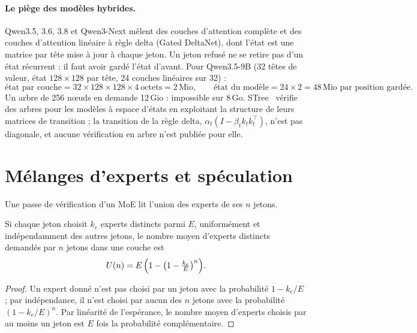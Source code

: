 \paragraph{Le piège des modèles hybrides.} Qwen3.5, 3.6, 3.8 et Qwen3-Next mêlent des couches d'attention complète et des couches d'attention linéaire à règle delta (Gated DeltaNet), dont l'état est une matrice par tête mise à jour à chaque jeton. Un jeton refusé ne se retire pas d'un état récurrent : il faut avoir gardé l'état d'avant. Pour Qwen3.5-9B (32 têtes de valeur, état $128 \times 128$ par tête, 24 couches linéaires sur 32) \calc :
\[
\text{état par couche} = 32 \times 128 \times 128 \times 4\ \text{octets} = 2\,\text{Mio}, \qquad \text{état du modèle} = 24 \times 2 = 48\,\text{Mio par position gardée}.
\]
Un arbre de 256 nœuds en demande 12\,Gio : impossible sur 8\,Go. STree~\cite{stree2025} vérifie des arbres pour les modèles à espace d'états en exploitant la structure de leurs matrices de transition ; la transition de la règle delta, $\alpha_t (I - \beta_t k_t k_t^\top)$, n'est pas diagonale, et aucune vérification en arbre n'est publiée pour elle.

\section{Mélanges d'experts et spéculation}\label{sec:moe-spec}

Une passe de vérification d'un MoE lit l'union des experts de ses $n$ jetons.

\begin{lemme}\label{lem:union}
Si chaque jeton choisit $k_e$ experts distincts parmi $E$, uniformément et indépendamment des autres jetons, le nombre moyen d'experts distincts demandés par $n$ jetons dans une couche est
\begin{equation}\label{eq:union}
U(n) = E\,\Bigl(1 - \bigl(1 - \tfrac{k_e}{E}\bigr)^{n}\Bigr).
\end{equation}
\end{lemme}

\begin{proof}
Un expert donné n'est pas choisi par un jeton avec la probabilité $1 - k_e/E$ ; par indépendance, il n'est choisi par aucun des $n$ jetons avec la probabilité $(1 - k_e/E)^n$. Par linéarité de l'espérance, le nombre moyen d'experts choisis par au moins un jeton est $E$ fois la probabilité complémentaire.
\end{proof}

